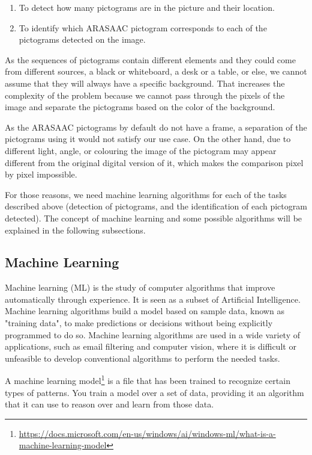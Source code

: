 \begin{enumerate}
  \item To detect how many pictograms are in the picture and their location.
  \item To identify which ARASAAC pictogram corresponds to each of the pictograms detected on the image.
\end{enumerate}

As the sequences of pictograms contain different elements and they could come from different sources, a black or whiteboard, a desk or a table, or else, we cannot assume that they will always have a  specific background. That increases the complexity of the problem because we cannot pass through the pixels of the image and separate the pictograms based on the color of the background.

As the ARASAAC pictograms by default do not have a frame, a separation of the pictograms using it would not satisfy our use case. On the other hand, due to different light, angle, or colouring the image of the pictogram may appear different from the original digital version of it, which makes the comparison pixel by pixel impossible.

For those reasons, we need machine learning algorithms for each of the tasks described above (detection of pictograms, and the identification of each pictogram detected). The concept of machine learning and some possible algorithms will be explained in the following subsections. 

\subsection{Machine Learning}
\label{Machine Learning}

Machine learning (ML) \citep{machineLearning} is the study of computer algorithms that improve automatically through experience. It is seen as a subset of Artificial Intelligence. Machine learning algorithms build a model based on sample data, known as "training data", to make predictions or decisions without being explicitly programmed to do so. Machine learning algorithms are used in a wide variety of applications, such as email filtering and computer vision, where it is difficult or unfeasible to develop conventional algorithms to perform the needed tasks.

A machine learning model\footnote{\href{https://docs.microsoft.com/en-us/windows/ai/windows-ml/what-is-a-machine-learning-model}{https://docs.microsoft.com/en-us/windows/ai/windows-ml/what-is-a-machine-learning-model}} is a file that has been trained to recognize certain types of patterns. You train a model over a set of data, providing it an algorithm that it can use to reason over and learn from those data.

